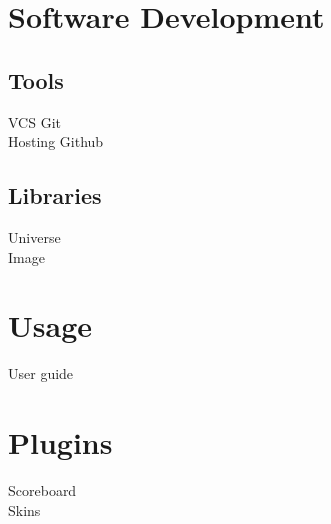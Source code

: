 \documentclass{article}
\begin{document}
 \section{Software Development}
 \subsection{Tools}
 VCS Git \\
Hosting Github

\subsection{Libraries}
Universe \\
Image

 \section{Usage}
 User guide

 \section{Plugins}
 Scoreboard \\
 Skins
\end{document}
